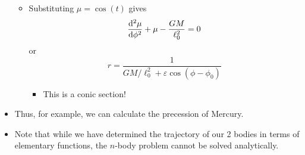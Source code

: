 \documentclass[../notes.tex]{subfiles}
\begin{document}
\begin{itemize}
\begin{itemize}
\begin{equation*}
        \end{equation*}
        \item Substituting $\mu=\cos(t)$ gives
        \begin{equation*}
            \dv[2]{\mu}{\phi}+\mu-\frac{GM}{\ell_0^2} = 0
        \end{equation*}
        or
        \begin{equation*}
            r = \frac{1}{GM/\ell_0^2+\varepsilon\cos(\phi-\phi_0)}
        \end{equation*}
        \begin{itemize}
            \item This is a conic section!
        \end{itemize}
    \end{itemize}
    \item Thus, for example, we can calculate the precession of Mercury.
    \item Note that while we have determined the trajectory of our 2 bodies in terms of elementary functions, the $n$-body problem cannot be solved analytically.
\end{itemize}
\end{document}
